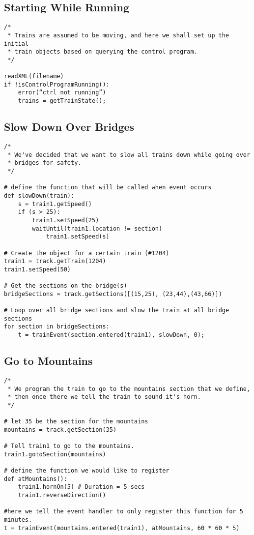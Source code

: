 \documentclass[a4paper,11pt,notitlepage]{article}
\begin{document}
\subsection{Starting While Running}
\begin{verbatim}
/*
 * Trains are assumed to be moving, and here we shall set up the initial
 * train objects based on querying the control program.
 */

readXML(filename)
if !isControlProgramRunning():
    error(“ctrl not running”)
	trains = getTrainState();
\end{verbatim}

\subsection{Slow Down Over Bridges}
\begin{verbatim}
/*
 * We've decided that we want to slow all trains down while going over
 * bridges for safety.
 */

# define the function that will be called when event occurs
def slowDown(train):
    s = train1.getSpeed()
	if (s > 25):
		train1.setSpeed(25)
		waitUntil(train1.location != section)
		    train1.setSpeed(s)

# Create the object for a certain train (#1204)
train1 = track.getTrain(1204)
train1.setSpeed(50)

# Get the sections on the bridge(s)
bridgeSections = track.getSections([(15,25), (23,44),(43,66)])

# Loop over all bridge sections and slow the train at all bridge sections
for section in bridgeSections:
    t = trainEvent(section.entered(train1), slowDown, 0);

\end{verbatim}
\subsection{Go to Mountains}
\begin{verbatim}
/*
 * We program the train to go to the mountains section that we define,
 * then once there we tell the train to sound it's horn.
 */

# let 35 be the section for the mountains
mountains = track.getSection(35)

# Tell train1 to go to the mountains.
train1.gotoSection(mountains)

# define the function we would like to register
def atMountains():
	train1.hornOn(5) # Duration = 5 secs
    train1.reverseDirection()

#here we tell the event handler to only register this function for 5 minutes.
t = trainEvent(mountains.entered(train1), atMountains, 60 * 60 * 5)



\end{verbatim}
\end{document}

